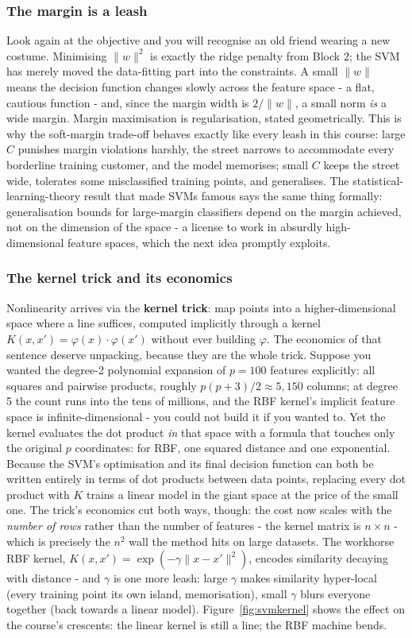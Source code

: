 \documentclass[11pt,a4paper]{article}
\begin{document}
\subsubsection{The margin is a leash}
Look again at the objective and you will recognise an old friend
wearing a new costume. Minimising $\lVert w \rVert^2$ is exactly the
ridge penalty from Block 2; the SVM has merely moved the data-fitting
part into the constraints. A small $\lVert w \rVert$ means the decision
function changes slowly across the feature space - a flat, cautious
function - and, since the margin width is $2/\lVert w \rVert$, a small
norm \emph{is} a wide margin. Margin maximisation is regularisation,
stated geometrically. This is why the soft-margin trade-off behaves
exactly like every leash in this course: large $C$ punishes margin
violations harshly, the street narrows to accommodate every borderline
training customer, and the model memorises; small $C$ keeps the street
wide, tolerates some misclassified training points, and generalises.
The statistical-learning-theory result that made SVMs famous says the
same thing formally: generalisation bounds for large-margin classifiers
depend on the margin achieved, not on the dimension of the space - a
license to work in absurdly high-dimensional feature spaces, which the
next idea promptly exploits.

\subsubsection{The kernel trick and its economics}
Nonlinearity arrives via the \textbf{kernel trick}: map points into a
higher-dimensional space where a line suffices, computed implicitly
through a kernel $K(x, x') = \varphi(x) \cdot \varphi(x')$ without ever
building $\varphi$. The economics of that sentence deserve unpacking,
because they are the whole trick. Suppose you wanted the degree-2
polynomial expansion of $p = 100$ features explicitly: all squares and
pairwise products, roughly $p(p+3)/2 \approx 5{,}150$ columns; at
degree 5 the count runs into the tens of millions, and the RBF
kernel's implicit feature space is infinite-dimensional - you could
not build it if you wanted to. Yet the kernel evaluates the dot
product \emph{in} that space with a formula that touches only the
original $p$ coordinates: for RBF, one squared distance and one
exponential. Because the SVM's optimisation and its final decision
function can both be written entirely in terms of dot products between
data points, replacing every dot product with $K$ trains a linear
model in the giant space at the price of the small one. The trick's
economics cut both ways, though: the cost now scales with the
\emph{number of rows} rather than the number of features - the
kernel matrix is $n \times n$ - which is precisely the $n^2$ wall
the method hits on large datasets. The workhorse RBF kernel,
$K(x, x') = \exp(-\gamma \lVert x - x' \rVert^2)$, encodes similarity
decaying with distance - and $\gamma$ is one more leash: large
$\gamma$ makes similarity hyper-local (every training point its own
island, memorisation), small $\gamma$ blurs everyone together (back
towards a linear model).
Figure~\ref{fig:svmkernel} shows the effect on the course's crescents:
the linear kernel is still a line; the RBF machine bends.
\end{document}
